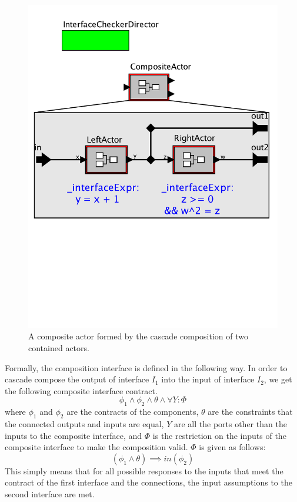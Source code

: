 \documentclass[preprint,11pt]{sigplanconf}
\begin{document}
\begin{figure}[htbp]
\centering %
\includegraphics[width=\columnwidth]{figs/cascadeComp} 
\caption{A composite actor formed by the cascade composition of two contained
actors.}
\label{fig:cascadeComp}
\end{figure}

Formally, the composition interface is defined in the following way. In order
to cascade compose the output of interface $I_1$ into the input of interface
$I_2$, we get the following composite interface contract.
\[
\phi_1 \wedge \phi_2 \wedge \theta \wedge \forall Y: \Phi
\]
where $\phi_1$ and $\phi_2$ are the contracts of the components, $\theta$ are
the constraints that the connected outputs and inputs are equal, $Y$ are all
the ports other than the inputs to the composite interface, and $\Phi$ is the
restriction on the inputs of the composite interface to make the composition valid.
$\Phi$ is given as follows:
\[
(\phi_1 \wedge \theta) \implies in(\phi_2)
\]
This simply means that for all possible responses to the inputs that meet the
contract of the first interface and the connections, the input assumptions to
the second interface are met.
\end{document}
